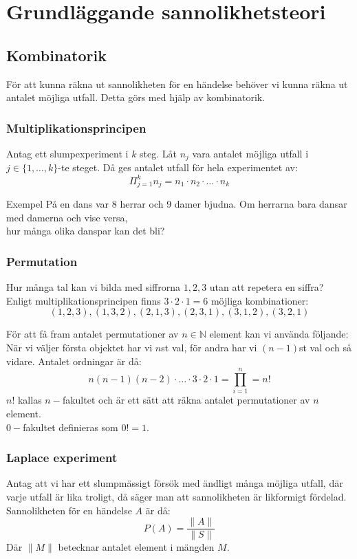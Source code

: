 \chapter{Grundläggande sannolikhetsteori}

\section{Kombinatorik}
För att kunna räkna ut sannolikheten för en händelse behöver vi kunna räkna ut antalet möjliga utfall. Detta görs med hjälp av kombinatorik.\\

\subsection{Multiplikationsprincipen}
Antag ett slumpexperiment i $k$ steg. Låt $n_j$ vara antalet möjliga utfall i $j\in\{1,\dots,k\}$-te steget. Då ges antalet utfall för hela experimentet av:
$$
	\Pi^k_{j=1}n_j=n_1\cdot n_2\cdot\ldots\cdot n_k
$$
\begin{exempel}{Exempel}
	På en dans var 8 herrar och 9 damer bjudna. Om herrarna bara dansar med damerna och vise versa,\\ hur många olika danspar kan det bli?
\end{exempel}

\subsection{Permutation}
Hur många tal kan vi bilda med siffrorna ${1,2,3}$ utan att repetera en siffra?\\
Enligt multiplikationsprincipen finns $3\cdot2\cdot1=6$ möjliga kombinationer:
$$
	(1,2,3),(1,3,2),(2,1,3),(2,3,1),(3,1,2),(3,2,1)
$$

För att få fram antalet permutationer av $n\in\mathbb{N}$ element kan vi använda följande:\\
När vi väljer första objektet har vi $n$st val, för andra har vi $(n-1)$st val och så vidare. Antalet ordningar är då:
$$
	n(n-1)(n-2)\cdot\ldots\cdot3\cdot2\cdot1=\prod^n_{i=1}=n!
$$
$n!$ kallas $n-$fakultet och är ett sätt att räkna antalet permutationer av $n$ element.\\
$0-$fakultet definieras som $0!=1$.

\subsection{Laplace experiment}
Antag att vi har ett slumpmässigt försök med ändligt många möjliga utfall, där varje utfall är lika troligt, då säger man att sannolikheten är likformigt fördelad. Sannolikheten för en händelse $A$ är då:
$$
	P(A)=\frac{\|A\|}{\|S\|}
$$
Där $\|M\|$ betecknar antalet element i mängden $M$.

